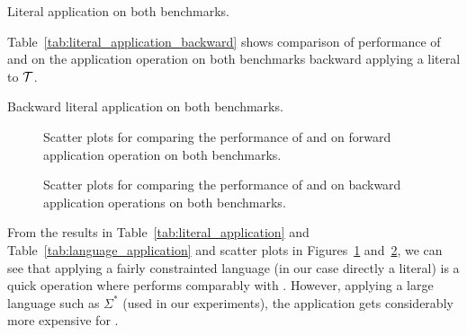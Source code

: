 \begin{table}[ht]
  \centering
  
  \caption{
    Literal application on both benchmarks.
  }
  \label{tab:literal_application}
\end{table}

Table~\ref{tab:literal_application_backward} shows comparison of performance of \mata and \mona on the application operation on both benchmarks backward applying a literal to $\mathcal{T}$.

\begin{table}[ht]
  \centering
  
  \caption{
    Backward literal application on both benchmarks.
  }
  \label{tab:literal_application_backward}
\end{table}

\begin{figure}[ht]
    \centering
    \quad
    \caption{
      Scatter plots for comparing the performance of \mata and \mona on forward application operation on both benchmarks.
    }
    \label{fig:apply_operation}%
\end{figure}

\begin{figure}[ht]
    \centering
    \quad
    \caption{
      Scatter plots for comparing the performance of \mata and \mona on backward application operations on both benchmarks.
    }
    \label{fig:apply_operation_backward}%
\end{figure}

From the results in Table~\ref{tab:literal_application} and Table~\ref{tab:language_application} and scatter plots in Figures~\ref{fig:apply_operation} and~\ref{fig:apply_operation_backward}, we can see that applying a fairly constrainted language (in our case directly a literal) is a quick operation where \mata performs comparably with \mona.
However, applying a large language such as $\Sigma^*$ (used in our experiments), the application gets considerably more expensive for \mata.

